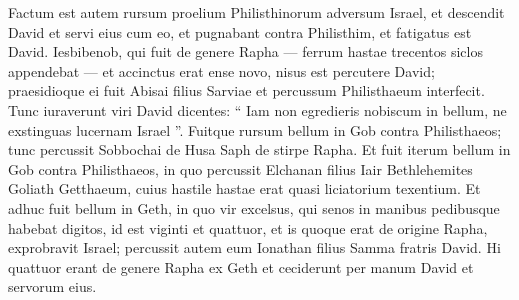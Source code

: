 \begin{biblechapter}
\begin{biblechapter}
\begin{biblechapter}
\begin{biblechapter}
\begin{biblechapter}
\begin{biblechapter}
\begin{biblechapter}
\begin{biblechapter}
\begin{biblechapter}
\begin{biblechapter}
\begin{biblechapter}
\begin{biblechapter}
\begin{biblechapter}
\begin{biblechapter}
\begin{biblechapter}
\begin{biblechapter}
\begin{biblechapter}
\begin{biblechapter}
\begin{biblechapter}
\begin{biblechapter}
\begin{biblechapter}
 \verse Factum est autem rursum proelium Philisthinorum adversum Israel, et descendit David et servi eius cum eo, et pugnabant contra Philisthim, et fatigatus est David. 
\verse Iesbibenob, qui fuit de genere Rapha — ferrum hastae trecentos siclos appendebat — et accinctus erat ense novo, nisus est percutere David; 
 \verse praesidioque ei fuit Abisai filius Sarviae et percussum Philisthaeum interfecit. Tunc iuraverunt viri David dicentes: “ Iam non egredieris nobiscum in bellum, ne exstinguas lucernam Israel ”.
 \verse Fuitque rursum bellum in Gob contra Philisthaeos; tunc percussit Sobbochai de Husa Saph de stirpe Rapha.
 \verse Et fuit iterum bellum in Gob contra Philisthaeos, in quo percussit Elchanan filius Iair Bethlehemites Goliath Getthaeum, cuius hastile hastae erat quasi liciatorium texentium.
 \verse Et adhuc fuit bellum in Geth, in quo vir excelsus, qui senos in manibus pedibusque habebat digitos, id est viginti et quattuor, et is quoque erat de origine Rapha, 
\verse exprobravit Israel; percussit autem eum Ionathan filius Samma fratris David.
 \verse Hi quattuor erant de genere Rapha ex Geth et ceciderunt per manum David et servorum eius.
 

\end{biblechapter}
\end{biblechapter}
\end{biblechapter}
\end{biblechapter}
\end{biblechapter}
\end{biblechapter}
\end{biblechapter}
\end{biblechapter}
\end{biblechapter}
\end{biblechapter}
\end{biblechapter}
\end{biblechapter}
\end{biblechapter}
\end{biblechapter}
\end{biblechapter}
\end{biblechapter}
\end{biblechapter}
\end{biblechapter}
\end{biblechapter}
\end{biblechapter}
\end{biblechapter}
